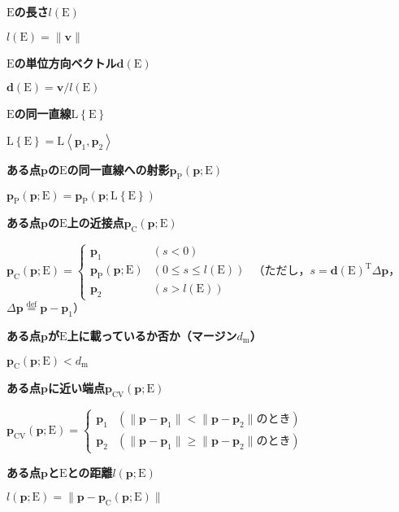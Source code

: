 ﻿\documentclass[a4paper]{jsarticle}
\begin{document}
{\bf $\mathrm{E}$の長さ$l(\mathrm{E})$}

$l(\mathrm{E})=\|\bm{v}\|$

{\bf $\mathrm{E}$の単位方向ベクトル$\bm{d}(\mathrm{E})$}

$\bm{d}(\mathrm{E})=\bm{v}/l(\mathrm{E})$

{\bf $\mathrm{E}$の同一直線$\mathrm{L}\left\{\mathrm{E}\right\}$}

$\mathrm{L}\left\{\mathrm{E}\right\}=\mathrm{L}\left<\bm{p}_{1},\bm{p}_{2}\right>$

{\bf ある点$\bm{p}$の$\mathrm{E}$の同一直線への射影$\bm{p}_{\mathrm{P}}(\bm{p};\mathrm{E})$}

$\bm{p}_{\mathrm{P}}(\bm{p};\mathrm{E})=\bm{p}_{\mathrm{P}}(\bm{p};\mathrm{L}\left\{\mathrm{E}\right\})$

{\bf ある点$\bm{p}$の$\mathrm{E}$上の近接点$\bm{p}_{\mathrm{C}}(\bm{p};\mathrm{E})$}

$\bm{p}_{\mathrm{C}}(\bm{p};\mathrm{E})=\begin{cases}
\bm{p}_{1} & (s<0) \\
\bm{p}_{\mathrm{P}}(\bm{p};\mathrm{E}) & (0\leq s\leq l(\mathrm{E})) \\
\bm{p}_{2} & (s>l(\mathrm{E}))
\end{cases}$
（ただし，$s=\bm{d}(\mathrm{E})^{\mathrm{T}}\varDelta\bm{p}$，
$\varDelta\bm{p}\overset{\mathrm{def}}{=}\bm{p}-\bm{p}_{1}$）

{\bf ある点$\bm{p}$が$\mathrm{E}$上に載っているか否か（マージン$d_{\mathrm{m}}$）}

$\bm{p}_{\mathrm{C}}(\bm{p};\mathrm{E})<d_{\mathrm{m}}$

{\bf ある点$\bm{p}$に近い端点$\bm{p}_{\mathrm{CV}}(\bm{p};\mathrm{E})$}

$\bm{p}_{\mathrm{CV}}(\bm{p};\mathrm{E})=\begin{cases}
\bm{p}_{1} & (\|\bm{p}-\bm{p}_{1}\|<\|\bm{p}-\bm{p}_{2}\|\mbox{のとき}) \\
\bm{p}_{2} & (\|\bm{p}-\bm{p}_{1}\|\geq\|\bm{p}-\bm{p}_{2}\|\mbox{のとき})
\end{cases}$

{\bf ある点$\bm{p}$と$\mathrm{E}$との距離$l(\bm{p};\mathrm{E})$}

$l(\bm{p};\mathrm{E})=\|\bm{p}-\bm{p}_{\mathrm{C}}(\bm{p};\mathrm{E})\|$
\end{document}
